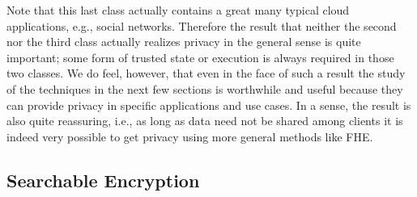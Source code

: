 \documentclass[11pt, a4paper]{article}
\begin{document}
Note that this last class actually contains a great many typical cloud applications, e.g., social networks.
Therefore the result that neither the second nor the third class actually realizes privacy in the general sense is quite important; some form of trusted state or execution is always required in those two classes.
We do feel, however, that even in the face of such a result the study of the techniques in the next few sections is worthwhile and useful because they can provide privacy in specific applications and use cases.
In a sense, the result is also quite reassuring, i.e., as long as data need not be shared among clients it is indeed very possible to get privacy using more general methods like FHE.



\subsection{Searchable Encryption}
\end{document}
